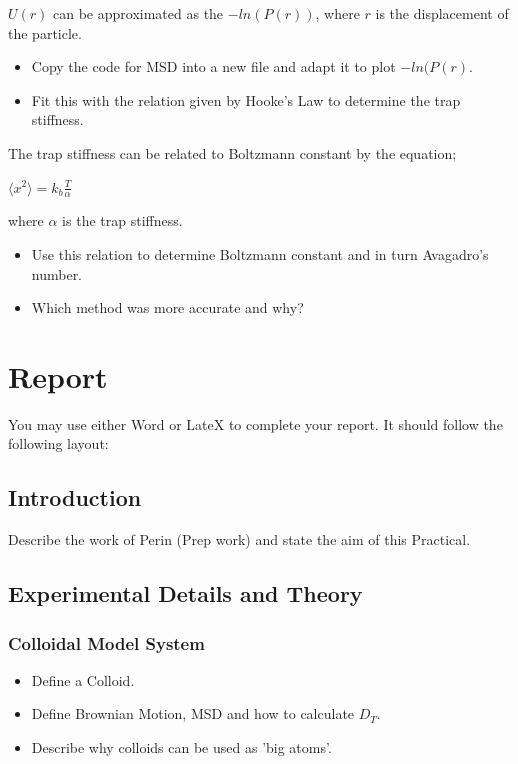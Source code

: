 \documentclass[12pt,a4paper,twoside]{article}
\begin{document}
$U(r)$ can be approximated as the $-ln(P(r))$, where $r$ is the displacement of the particle. 
 \begin{itemize}
	\item Copy the code for MSD into a new file and adapt it to plot $-ln(P(r)$.
	\item Fit this with the relation given by Hooke's Law to determine the trap stiffness.
	\vspace{2cm}
\end{itemize}

The trap stiffness can be related to Boltzmann constant by the equation;

$ \langle x^2 \rangle = k_b \frac{T}{\alpha}$

where $\alpha$ is the trap stiffness.

\begin{itemize}
    \item Use this relation to determine Boltzmann constant and in turn Avagadro's number.
    \vspace{2cm}
    \item Which method was more accurate and why?
    \vspace{2cm}
\end{itemize}

\newpage

\section{Report}
You may use either Word or LateX to complete your report. It should follow the following layout:

\subsection{Introduction}
Describe the work of Perin (Prep work) and state the aim of this Practical.

\subsection{Experimental Details and Theory}
\subsubsection{Colloidal Model System}
 \begin{itemize}
	\item Define a Colloid.
	\item Define Brownian Motion, MSD and how to calculate $D_T$.
	\item Describe why colloids can be used as 'big atoms'.	
\end{itemize}
\end{document}
